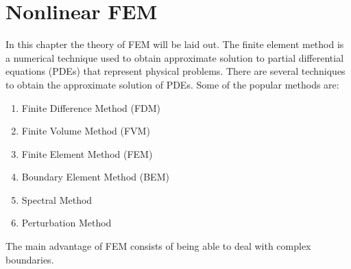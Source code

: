 

\newpage
\section{Nonlinear FEM}
\label{s:Finite Element Modeling}

In this chapter the theory of FEM will be laid out.
The finite element method is a numerical technique used to obtain approximate solution to partial differential equations (PDEs) that represent physical problems. There are several techniques to obtain the approximate solution of PDEs. Some of the popular methods are:
\begin{enumerate}
\item Finite Difference Method (FDM)
\item Finite Volume Method (FVM)
\item Finite Element Method (FEM)
\item Boundary Element Method (BEM)
\item Spectral Method
\item Perturbation Method
\end{enumerate}
The main advantage of FEM consists of being able to deal with complex boundaries.
